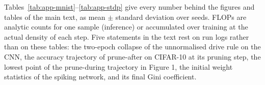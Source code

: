 Tables~\ref{tab:app-mnist}--\ref{tab:app-stdp} give every number behind the figures and tables of the main text, as mean $\pm$ standard deviation over seeds. FLOPs are analytic counts for one sample (inference) or accumulated over training at the actual density of each step. Five statements in the text rest on run logs rather than on these tables: the two-epoch collapse of the unnormalised drive rule on the CNN, the accuracy trajectory of prune-after on CIFAR-10 at its pruning step, the lowest point of the prune-during trajectory in Figure 1, the initial weight statistics of the spiking network, and its final Gini coefficient.


















